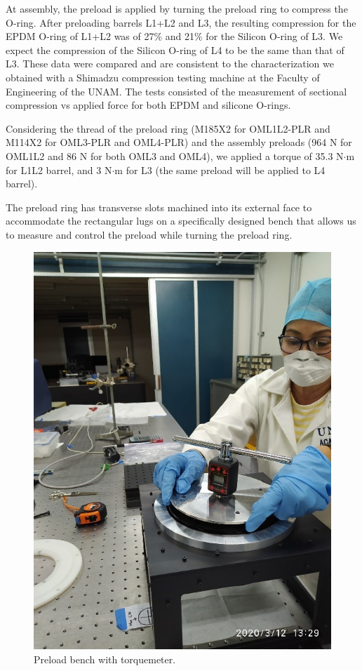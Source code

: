 \documentclass{report}
\begin{document}
At assembly, the preload is applied by turning the preload ring to compress the O-ring. After preloading barrels L1+L2 and L3, the resulting compression for the EPDM O-ring of L1+L2 was of 27\% and 21\% for the Silicon O-ring of L3. We expect the compression of the Silicon O-ring of L4 to be the same than that of L3.
These data were compared and are consistent to the characterization we obtained with a Shimadzu compression testing machine at the Faculty of Engineering of the UNAM. The tests consisted of the measurement of sectional compression vs applied force for both EPDM and silicone O-rings.

Considering the thread of the preload ring (M185X2 for OML1L2-PLR and M114X2 for OML3-PLR and OML4-PLR) and the assembly preloads (964 N for OML1L2 and 86 N for both OML3 and OML4), we applied a torque of 35.3 N$\cdot$m for L1L2 barrel, and 3 N$\cdot$m for L3 (the same preload will be applied to L4 barrel).

The preload ring has transverse slots machined into its external face to accommodate the rectangular lugs on a specifically designed bench that allows us to measure and control the preload while turning the preload ring.

\begin{figure}
\begin{center}
\includegraphics[width=0.7\linewidth]{figures/preload_bench.jpg}
\end{center}
\caption{Preload bench with torquemeter.}
\label{figure:ploadB}
\end{figure}
\end{document}
